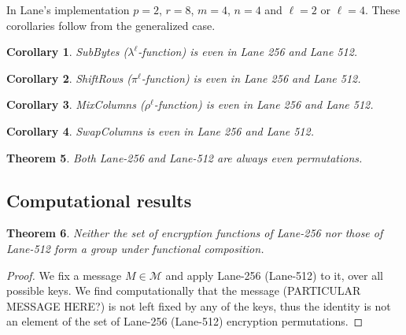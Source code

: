 \documentclass[11pt]{amsart}
\newcommand{\MM}{\mathcal{M}}
\newtheorem{theorem}{{\bf Theorem }}
\newtheorem{corollary}[theorem]{{\bf Corollary}}
\begin{document}
In Lane's implementation $p = 2$, $r = 8$, $m = 4$, $n = 4$ and $\ell = 2$ or $\ell = 4$. These corollaries follow from the generalized case.

\begin{corollary}
SubBytes ($\lambda^\ell$-function) is even in Lane 256 and Lane 512.
\end{corollary}

\begin{corollary}
ShiftRows ($\pi^\ell$-function) is even in Lane 256 and Lane 512.
\end{corollary}

\begin{corollary}
MixColumns ($\rho^\ell$-function) is even in Lane 256 and Lane 512.
\end{corollary}

\begin{corollary}
SwapColumns is even in Lane 256 and Lane 512.
\end{corollary}

\begin{theorem}
Both Lane-256 and Lane-512 are always even permutations.
\end{theorem}


\subsection{Computational results}
\begin{theorem}
Neither the set of encryption functions of Lane-256 nor those of Lane-512 form a group under functional composition. 
\end{theorem}

\begin{proof}
We fix a message $M \in \MM$ and apply Lane-256 (Lane-512) to it, over all possible keys. We find computationally that the message (PARTICULAR MESSAGE HERE?) is not left fixed by any of the keys, thus the identity is not an element of the set of Lane-256 (Lane-512) encryption permutations.
\end{proof}
\end{document}
